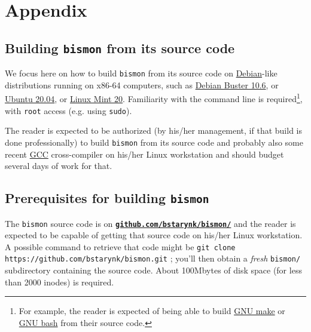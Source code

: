 \section{Appendix}
\label{sec:appendix}

\subsection{Building \texttt{bismon} from its source code}
\label{subsec:building-bismon}

We focus here on how to build \texttt{bismon} from its source code on
\href{http://debian.org/}{Debian}-like distributions running on
x86-64 computers, such as
\href{https://www.debian.org/releases/stable/}{Debian Buster 10.6}, or
\href{https://ubuntu.com/}{Ubuntu 20.04}, or
\href{https://linuxmint.com/}{Linux Mint 20}. Familiarity with the
command line is required\footnote{For example, the reader is expected
  of being able to build \href{https://www.gnu.org/software/make/}{GNU
    make} or \href{https://www.gnu.org/software/bash/}{GNU bash} from
  their source code.}, with \texttt{root} access (e.g. using
\texttt{sudo}).

The reader is expected to be authorized (by his/her management, if
that build is done professionally) to build \texttt{bismon} from its
source code and probably also some recent
\href{https://gcc.gnu.org/}{GCC} cross-compiler on his/her Linux workstation
and should budget several days of work for that.


\subsection{Prerequisites for building \texttt{bismon}}
\label{subsec:prereq-bismon}

The \texttt{bismon} source code is on
\href{https://github.com/bstarynk/bismon/}{\texttt{\textbf{github.com/bstarynk/bismon/}}}
and the reader is expected to be capable of getting that source code
on his/her Linux workstation. A possible command to retrieve that code
might be \texttt{git clone https://github.com/bstarynk/bismon.git} ;
you'll then obtain a \emph{fresh} \texttt{bismon/} subdirectory
containing the source code. About 100Mbytes of disk space (for less
than 2000 inodes) is required.

